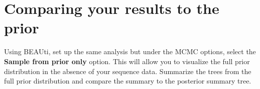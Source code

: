 \documentclass[11pt]{article}
\theoremstyle{plain}%
\theoremstyle{definition}
\theoremstyle{remark}
\begin{document}
\section{Comparing your results to the prior}

Using BEAUti, set up the same analysis but under the MCMC options, select the {\bf Sample from prior only} option. This will allow you to visualize the full prior distribution in the absence of your sequence data. Summarize the trees from the full prior
distribution and compare the summary to the posterior summary tree.




 









\end{document}
